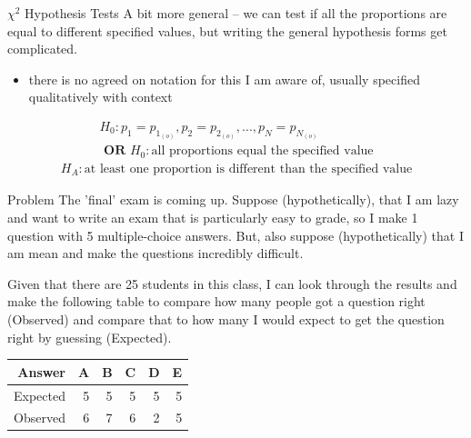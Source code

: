 \documentclass{beamer}
\begin{document}
\begin{frame}{$\chi^2$ Hypothesis Tests}
A bit more general -- we can test if all the proportions are equal to different specified values, but writing the general hypothesis forms get complicated.
\begin{itemize}
    \item there is no agreed on notation for this I am aware of, usually specified qualitatively with context
\end{itemize}
\begin{align*}
    H_0: p_1 = p_{1_{(o)}}, p_2 = p_{2_{(o)}}, ..., p_N = p_{N_{(o)}}\\
    \textbf{ OR } H_0: \text{all proportions equal the specified value}
\end{align*}
\begin{align*}
    H_A: \text{at least one proportion is different than the specified value}
\end{align*}
\end{frame}


\begin{frame}{Problem}
The 'final' exam is coming up. Suppose (hypothetically), that I am lazy and want to write an exam that is particularly easy to grade, so I make 1 question with 5 multiple-choice answers. But, also suppose (hypothetically) that I am mean and make the questions incredibly difficult. \vspace{6mm}

Given that there are 25 students in this class, I can look through the results and make the following table to compare how many people got a question right (Observed) and compare that to how many I would expect to get the question right by guessing (Expected).
\vspace{6mm}

\begin{table}[ht]
\centering
\begin{tabular}{rrrrrr}
  \hline
Answer & A & B & C & D & E \\ 
  \hline
Expected & 5 & 5 & 5 & 5 & 5 \\ 
  Observed & 6 & 7 & 6 & 2 & 5 \\ 
   \hline
\end{tabular}
\end{table}
\end{frame}
\end{document}
